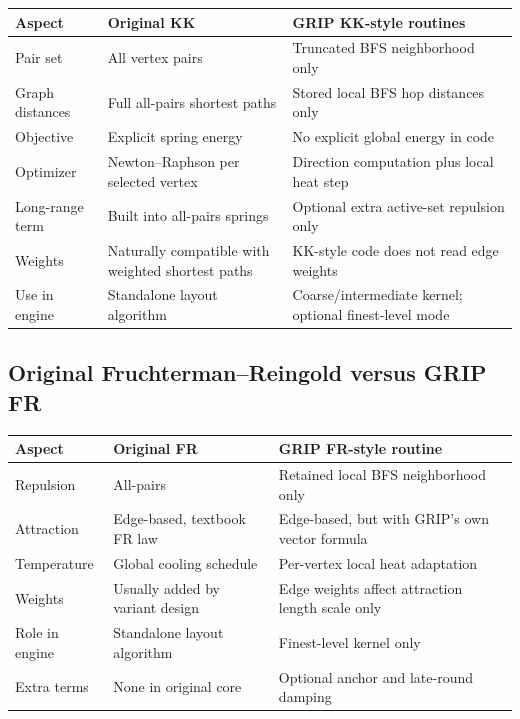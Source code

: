 \documentclass[11pt]{article}
\begin{document}
\begin{center}
\small
\begin{tabular}{>{\raggedright\arraybackslash}p{} >{\raggedright\arraybackslash}p{} >{\raggedright\arraybackslash}p{}}
\toprule
\textbf{Aspect} & \textbf{Original KK} & \textbf{GRIP KK-style routines} \\
\midrule
Pair set & All vertex pairs & Truncated BFS neighborhood only \\
Graph distances & Full all-pairs shortest paths & Stored local BFS hop distances only \\
Objective & Explicit spring energy & No explicit global energy in code \\
Optimizer & Newton--Raphson per selected vertex & Direction computation plus local heat step \\
Long-range term & Built into all-pairs springs & Optional extra active-set repulsion only \\
Weights & Naturally compatible with weighted shortest paths & KK-style code does not read edge weights \\
Use in engine & Standalone layout algorithm & Coarse/intermediate kernel; optional finest-level mode \\
\bottomrule
\end{tabular}
\end{center}

\subsection{Original Fruchterman--Reingold versus GRIP FR}

\begin{center}
\small
\begin{tabular}{>{\raggedright\arraybackslash}p{} >{\raggedright\arraybackslash}p{} >{\raggedright\arraybackslash}p{}}
\toprule
\textbf{Aspect} & \textbf{Original FR} & \textbf{GRIP FR-style routine} \\
\midrule
Repulsion & All-pairs & Retained local BFS neighborhood only \\
Attraction & Edge-based, textbook FR law & Edge-based, but with GRIP's own vector formula \\
Temperature & Global cooling schedule & Per-vertex local heat adaptation \\
Weights & Usually added by variant design & Edge weights affect attraction length scale only \\
Role in engine & Standalone layout algorithm & Finest-level kernel only \\
Extra terms & None in original core & Optional anchor and late-round damping \\
\bottomrule
\end{tabular}
\end{center}
\end{document}
